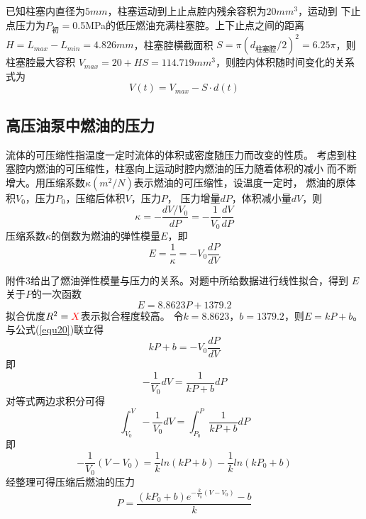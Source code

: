 \documentclass[withoutpreface,bwprint]{cumcmthesis} %
\begin{document}
    已知柱塞内直径为$5mm$，柱塞运动到上止点腔内残余容积为$20mm^3$，运动到
    下止点压力为$P_{\text{初}}=$0.5MPa的低压燃油充满柱塞腔。上下止点之间的距离
    $H=L_{max}-L_{min}=4.826mm$，柱塞腔横截面积
    $S=\pi(d_{\text{柱塞腔}}/2)^2=6.25\pi$，则柱塞腔最大容积
    $V_{max}=20+HS=114.719mm^3$，则腔内体积随时间变化的关系式为
    \begin{equation}
        V(t)=V_{max}-S \cdot d(t)
    \label{equ18.1}
    \end{equation}
    

\subsection{高压油泵中燃油的压力}
    流体的可压缩性指温度一定时流体的体积或密度随压力而改变的性质。
    考虑到柱塞腔内燃油的可压缩性，柱塞向上运动时腔内燃油的压力随着体积的减小
    而不断增大。用压缩系数$\kappa(m^2/N)$表示燃油的可压缩性，设温度一定时，
    燃油的原体积$V_0$，压力$P_0$，压缩后体积$V$，压力$P$，
    压力增量$dP$，体积减小量$dV$，则
    \begin{equation}
        \kappa = -\frac{dV/V_0}{dP}=-\frac{1}{V_0}\frac{dV}{dP}
    \label{equ19}
    \end{equation}
    压缩系数$\kappa$的倒数为燃油的弹性模量$E$，即
    \begin{equation}
        E=\frac{1}{\kappa}=-V_0\frac{dP}{dV}
    \label{equ20}
    \end{equation}
    
    附件3给出了燃油弹性模量与压力的关系。对题中所给数据进行线性拟合，得到
    $E$关于$P$的一次函数
    \begin{equation}
        E=8.8623P+1379.2
    \label{equ21}
    \end{equation}
    拟合优度$R^2={\color{red}X}$表示拟合程度较高。
    令$k=8.8623$，$b=1379.2$，则$E=kP+b$。与公式(\ref{equ20})联立得
    \begin{equation}
        kP+b=-V_0\frac{dP}{dV}
    \label{equ22}
    \end{equation}
    即
    \begin{equation}
        -\frac{1}{V_0}dV=\frac{1}{kP+b}dP
    \label{equ23}
    \end{equation}
    对等式两边求积分可得
    \begin{equation}
        \int_{V_0}^V-\frac{1}{V_0}dV=\int_{P_0}^P\frac{1}{kP+b}dP
    \label{equ24}
    \end{equation}
    即
    \begin{equation}
        -\frac{1}{V_0}(V-V_0)=\frac{1}{k}ln(kP+b)-\frac{1}{k}ln(kP_0+b)
    \label{equ25}
    \end{equation}
    经整理可得压缩后燃油的压力
    \begin{equation}
        P=\frac{(kP_0+b)e^{-\frac{k}{V_0}(V-V_0)}-b}{k}
    \label{equ26}
    \end{equation}
    
\end{document}
